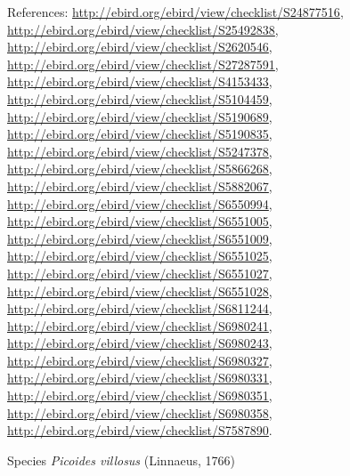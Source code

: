 \documentclass[9pt, article]{memoir}
\begin{document}
\begin{multicols}{2}
\vspace{6pt}References: 
\url{http://ebird.org/ebird/view/checklist/S24877516}, 
\url{http://ebird.org/ebird/view/checklist/S25492838}, 
\url{http://ebird.org/ebird/view/checklist/S2620546}, 
\url{http://ebird.org/ebird/view/checklist/S27287591}, 
\url{http://ebird.org/ebird/view/checklist/S4153433}, 
\url{http://ebird.org/ebird/view/checklist/S5104459}, 
\url{http://ebird.org/ebird/view/checklist/S5190689}, 
\url{http://ebird.org/ebird/view/checklist/S5190835}, 
\url{http://ebird.org/ebird/view/checklist/S5247378}, 
\url{http://ebird.org/ebird/view/checklist/S5866268}, 
\url{http://ebird.org/ebird/view/checklist/S5882067}, 
\url{http://ebird.org/ebird/view/checklist/S6550994}, 
\url{http://ebird.org/ebird/view/checklist/S6551005}, 
\url{http://ebird.org/ebird/view/checklist/S6551009}, 
\url{http://ebird.org/ebird/view/checklist/S6551025}, 
\url{http://ebird.org/ebird/view/checklist/S6551027}, 
\url{http://ebird.org/ebird/view/checklist/S6551028}, 
\url{http://ebird.org/ebird/view/checklist/S6811244}, 
\url{http://ebird.org/ebird/view/checklist/S6980241}, 
\url{http://ebird.org/ebird/view/checklist/S6980243}, 
\url{http://ebird.org/ebird/view/checklist/S6980327}, 
\url{http://ebird.org/ebird/view/checklist/S6980331}, 
\url{http://ebird.org/ebird/view/checklist/S6980351}, 
\url{http://ebird.org/ebird/view/checklist/S6980358}, 
\url{http://ebird.org/ebird/view/checklist/S7587890}.

\vspace{6pt}\noindent\hspace{36pt}Species \textit{Picoides villosus} (Linnaeus, 1766)



\end{multicols}
\end{document}
